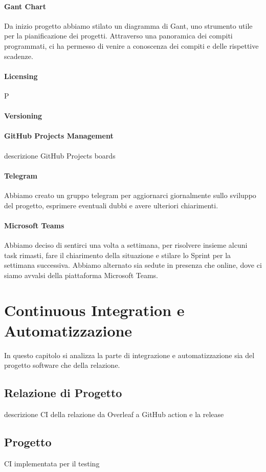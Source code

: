     \paragraph{Gant Chart} 
    Da inizio progetto abbiamo stilato un diagramma di Gant, uno strumento utile per la pianificazione dei progetti. Attraverso una panoramica dei compiti programmati, ci ha permesso di venire a conoscenza dei compiti e delle rispettive scadenze.
    
    \paragraph{Licensing} P
    
    \paragraph{Versioning}
    
    \paragraph{GitHub Projects Management}
    descrizione GitHub Projects boards 
    
    \paragraph{Telegram}
    Abbiamo creato un gruppo telegram per aggiornarci giornalmente sullo sviluppo del progetto, esprimere eventuali dubbi e avere ulteriori chiarimenti. 
    
    \paragraph{Microsoft Teams}
    Abbiamo deciso di sentirci una volta a settimana, per risolvere insieme alcuni task rimasti, fare il chiarimento della situazione e stilare lo Sprint per la settimana successiva. Abbiamo alternato sia sedute in presenza che online, dove ci siamo avvalsi della piattaforma Microsoft Teams.
    
     

\section{Continuous Integration e Automatizzazione}
\label{chap:CI}
In questo capitolo si analizza la parte di integrazione e automatizzazione sia del progetto software che della relazione. 
    \subsection{Relazione di Progetto}
        descrizione CI della relazione da Overleaf a GitHub action e la release

    \subsection{Progetto}
        CI implementata per il testing 
        
        






